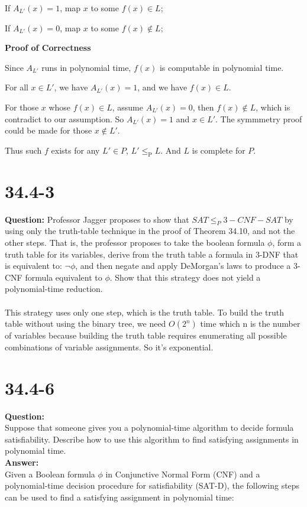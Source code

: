 \documentclass[12pt]{article}
\begin{document}
If $A_{L'}(x)=1$, map $x$ to some $f(x) \in L$;

If $A_{L'}(x)=0$, map $x$ to some $f(x) \notin L$;

\textbf{Proof of Correctness}

Since $A_{L'}$  runs in polynomial time, $f(x)$ is computable in polynomial time.

For all $x \in L'$, we have $A_{L'}(x) = 1$, and we have $f(x) \in L$.

For those $x$ whose $f(x) \in L$, assume $A_{L'}(x)=0$, then  $f(x) \notin L$, which is contradict to our assumption. So  $A_{L'}(x)=1$ and $x \in L'$. The symmmetry proof could be made for those $x \notin L'$.

Thus such $f$ exists for any $L' \in P$, $L' \le_\text{P} L$. And $L$ is complete for $P$.

\section{34.4-3}
\textbf{Question: }Professor Jagger proposes to show that \(SAT \leq_P 3-CNF-SAT \) by using only the truth-table technique in the proof of Theorem 34.10, and not the other steps. That is, the professor proposes to take the boolean formula \(\phi\), form a truth table for its variables, derive from the truth table a formula in 3-DNF that is equivalent
to: \(\lnot\phi\), and then negate and apply DeMorgan’s laws to produce a 3-CNF formula
equivalent to \(\phi\). Show that this strategy does not yield a polynomial-time reduction.
\\
\\
This strategy uses only one step, which is the truth table. To build the truth table without using the binary tree, we need \(O(2^n)\) time which n is the number of variables because building the truth table requires enumerating all possible combinations of variable assignments. So it's exponential.

\section{34.4-6}
\textbf{Question:}\\
Suppose that someone gives you a polynomial-time algorithm to decide formula
satisfiability. Describe how to use this algorithm to find satisfying assignments in
polynomial time.\\
\textbf{Answer:}\\
Given a Boolean formula \( \phi \) in Conjunctive Normal Form (CNF) and a polynomial-time decision procedure for satisfiability (SAT-D), the following steps can be used to find a satisfying assignment in polynomial time:
\end{document}
